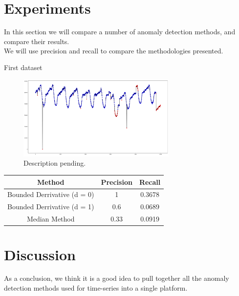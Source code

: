 \documentclass[a4paper, 10pt]{article}
\begin{document}
\section{Experiments \label{experiments}}

In this section we will compare a number of anomaly detection methods, and compare their results. \\

We will use precision and recall to compare the methodologies presented.

First dataset

\begin{figure}
\centering
\includegraphics[width=0.7\textwidth]{testplot1}   
\caption{Description pending.}
\label{fig:test1}
\end{figure}

\FloatBarrier

\begin{center}
\begin{tabular}{| c | c | c |}
\hline
Method                      & Precision & Recall \\ \hline
Bounded Derrivative (d = 0) & 1         & 0.3678 \\ \hline
Bounded Derrivative (d = 1) & 0.6       & 0.0689 \\ \hline
Median Method               & 0.33      & 0.0919 \\ \hline
\end{tabular}
\end{center}

\section{Discussion \label{discussion}}

As a conclusion, we think it is a good idea to pull together all the anomaly detection methods used for time-series into a single platform.

 

\end{document}
